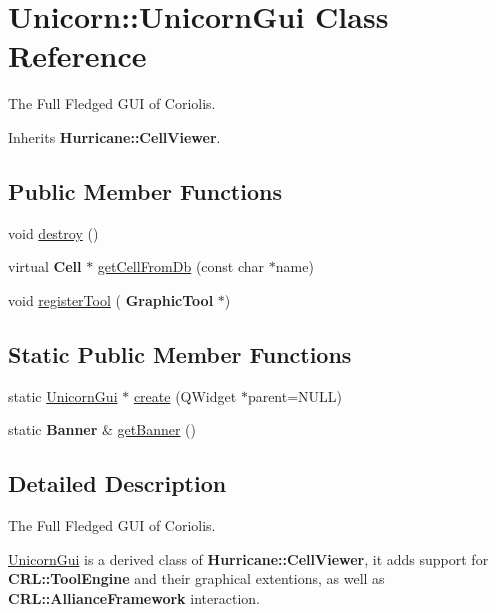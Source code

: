 \hypertarget{classUnicorn_1_1UnicornGui}{}\section{Unicorn\+:\+:Unicorn\+Gui Class Reference}
\label{classUnicorn_1_1UnicornGui}


The Full Fledged G\+UI of Coriolis.  




Inherits \textbf{ Hurricane\+::\+Cell\+Viewer}.

\subsection*{Public Member Functions}
\begin{DoxyCompactItemize}
\item 
void \hyperlink{classUnicorn_1_1UnicornGui_a7cff59c0e315b6f46f7cb4454732cd7a}{destroy} ()
\item 
virtual \textbf{ Cell} $\ast$ \hyperlink{classUnicorn_1_1UnicornGui_a698cb62a4c8df9fd6b7d626fb44cc439}{get\+Cell\+From\+Db} (const char $\ast$name)
\item 
void \hyperlink{classUnicorn_1_1UnicornGui_a89346bccf1908c92786987d046aa6175}{register\+Tool} (\textbf{ Graphic\+Tool} $\ast$)
\end{DoxyCompactItemize}
\subsection*{Static Public Member Functions}
\begin{DoxyCompactItemize}
\item 
static \hyperlink{classUnicorn_1_1UnicornGui}{Unicorn\+Gui} $\ast$ \hyperlink{classUnicorn_1_1UnicornGui_a8a7a37531e1596b9396c61598ee55bc2}{create} (Q\+Widget $\ast$parent=N\+U\+LL)
\item 
static \textbf{ Banner} \& \hyperlink{classUnicorn_1_1UnicornGui_a87215204ace67db47db09f5d9e78b85e}{get\+Banner} ()
\end{DoxyCompactItemize}


\subsection{Detailed Description}
The Full Fledged G\+UI of Coriolis. 

\hyperlink{classUnicorn_1_1UnicornGui}{Unicorn\+Gui} is a derived class of \textbf{ Hurricane\+::\+Cell\+Viewer}, it adds support for \textbf{ C\+R\+L\+::\+Tool\+Engine} and their graphical extentions, as well as \textbf{ C\+R\+L\+::\+Alliance\+Framework} interaction. 

